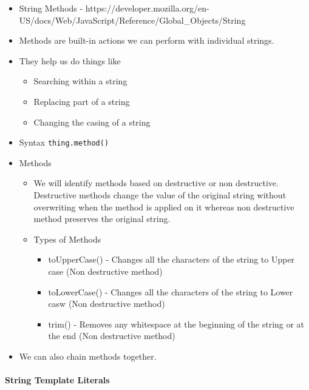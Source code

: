 \documentclass[
  paper=a4,
  ,captions=tableheading
]{scrartcl}
\providecommand{\tightlist}{%
  \setlength{\itemsep}{0pt}\setlength{\parskip}{0pt}}
\begin{document}
\begin{itemize}
\tightlist
\item
  String Methods -
  https://developer.mozilla.org/en-US/docs/Web/JavaScript/Reference/Global\_Objects/String
\item
  Methods are built-in actions we can perform with individual strings.
\item
  They help us do things like

  \begin{itemize}
  \tightlist
  \item
    Searching within a string
  \item
    Replacing part of a string
  \item
    Changing the casing of a string
  \end{itemize}
\item
  Syntax \texttt{thing.method()}
\item
  Methods

  \begin{itemize}
  \tightlist
  \item
    We will identify methods based on destructive or non destructive.
    Destructive methods change the value of the original string without
    overwriting when the method is applied on it whereas non destructive
    method preserves the original string.
  \item
    Types of Methods

    \begin{itemize}
    \tightlist
    \item
      toUpperCase() - Changes all the characters of the string to Upper
      case (Non destructive method)
    \item
      toLowerCase() - Changes all the characters of the string to Lower
      casw (Non destructive method)
    \item
      trim() - Removes any whitespace at the beginning of the string or
      at the end (Non destructive method)
    \end{itemize}
  \end{itemize}
\item
  We can also chain methods together.
\end{itemize}

\hypertarget{string-template-literals}{%
\paragraph{String Template Literals}\label{string-template-literals}}
\end{document}
